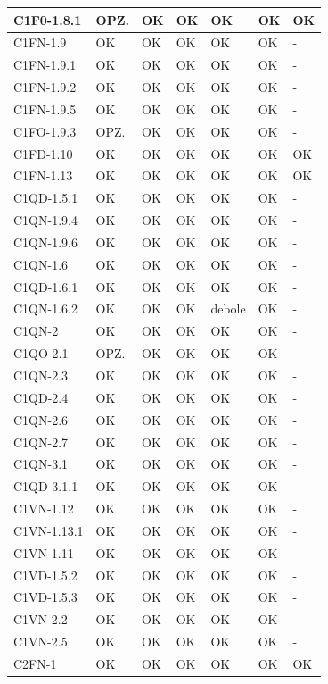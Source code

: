 \begin{footnotesize}
\begin{longtable}{|p{}|p{}|p{}|p{}|p{}|p{}|p{}|}
 C1F0-1.8.1&  OPZ.&  OK&  OK&  OK&  OK& OK\\ \hline
 C1FN-1.9&  OK&  OK&  OK&  OK&  OK& -\\ \hline
 C1FN-1.9.1&  OK&  OK&  OK&  OK&  OK& -\\ \hline
 C1FN-1.9.2&  OK&  OK&  OK&  OK&  OK& -\\ \hline
 C1FN-1.9.5&  OK&  OK&  OK&  OK&  OK& -\\ \hline
 C1FO-1.9.3&  OPZ.&  OK&  OK&  OK&  OK& -\\ \hline
 C1FD-1.10&  OK&  OK&  OK&  OK&  OK& OK\\ \hline
 C1FN-1.13&  OK&  OK&  OK&  OK&  OK& OK\\ \hline
 C1QD-1.5.1&  OK&  OK&  OK&  OK&  OK& -\\ \hline
 C1QN-1.9.4&  OK&  OK&  OK&  OK&  OK& -\\ \hline
 C1QN-1.9.6&  OK&  OK&  OK&  OK&  OK& -\\ \hline
 C1QN-1.6&  OK&  OK&  OK&  OK&  OK& -\\ \hline
 C1QD-1.6.1&  OK&  OK&  OK&  OK&  OK& -\\ \hline
 C1QN-1.6.2&  OK&  OK&  OK&  debole&  OK& -\\ \hline
 C1QN-2&  OK&  OK&  OK&  OK&  OK& -\\ \hline
 C1QO-2.1&  OPZ.&  OK&  OK&  OK&  OK& -\\ \hline
 C1QN-2.3&  OK&  OK&  OK&  OK&  OK& -\\ \hline
 C1QD-2.4&  OK&  OK&  OK&  OK&  OK& -\\ \hline
 C1QN-2.6&  OK&  OK&  OK&  OK&  OK& -\\ \hline
 C1QN-2.7&  OK&  OK&  OK&  OK&  OK& -\\ \hline
 C1QN-3.1&  OK&  OK&  OK&  OK&  OK& -\\ \hline
 C1QD-3.1.1&  OK&  OK&  OK&  OK&  OK& -\\ \hline
 C1VN-1.12&  OK&  OK&  OK&  OK&  OK& -\\ \hline
 C1VN-1.13.1&  OK&  OK&  OK&  OK&  OK& -\\ \hline
 C1VN-1.11&  OK&  OK&  OK&  OK&  OK& -\\ \hline
 C1VD-1.5.2&  OK&  OK&  OK&  OK&  OK& -\\ \hline
 C1VD-1.5.3&  OK&  OK&  OK&  OK&  OK& -\\ \hline
 C1VN-2.2&  OK&  OK&  OK&  OK&  OK& -\\ \hline
 C1VN-2.5&  OK&  OK&  OK&  OK&  OK& -\\ \hline
 C2FN-1&  OK&  OK&  OK&  OK&  OK& OK\\ \hline

\end{longtable}
\end{footnotesize}
